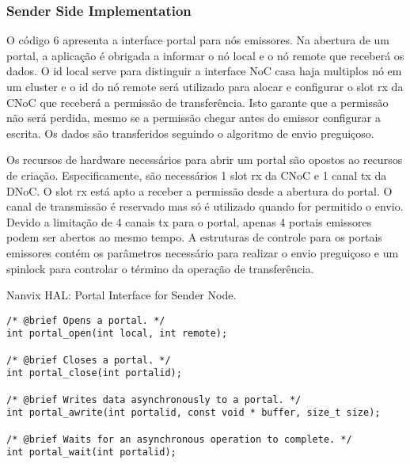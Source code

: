 			\subsubsection{Sender Side Implementation}

				O código 6 apresenta a interface portal para nós emissores.
				Na abertura de um portal, a aplicação é obrigada a informar o nó local e o nó remote que receberá os dados.
				O id local serve para distinguir a interface NoC casa haja multiplos nó em um cluster e o id do nó remote será utilizado para alocar e configurar o slot rx da CNoC que receberá a permissão de transferência.
				Isto garante que a permissão não será perdida, mesmo se a permissão chegar antes do emissor configurar a escrita.
				Os dados são transferidos seguindo o algoritmo de envio preguiçoso.

				Os recursos de hardware necessários para abrir um portal são opostos ao recursos de criação.
				Especificamente, são necessários 1 slot rx da CNoC e 1 canal tx da DNoC.
				O slot rx está apto a receber a permissão desde a abertura do portal.
				O canal de transmissão é reservado mas só é utilizado quando for permitido o envio.
				Devido a limitação de 4 canais tx para o portal, apenas 4 portais emissores podem ser abertos ao mesmo tempo.
				A estruturas de controle para os portais emissores contém os parâmetros necessário para realizar o envio preguiçoso e um spinlock para controlar o término da operação de transferência.

\begin{listing}[!tb]
\caption{Nanvix HAL: Portal Interface for Sender Node.}
\label{code:hal-portal-sender}
\begin{verbatim}
/* @brief Opens a portal. */
int portal_open(int local, int remote);

/* @brief Closes a portal. */
int portal_close(int portalid);

/* @brief Writes data asynchronously to a portal. */
int portal_awrite(int portalid, const void * buffer, size_t size);

/* @brief Waits for an asynchronous operation to complete. */
int portal_wait(int portalid);
\end{verbatim}
\end{listing}


